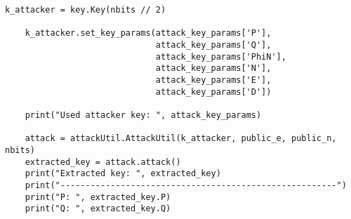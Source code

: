 \begin{lstlisting}[language=PyBrIM]
    k_attacker = key.Key(nbits // 2)

    k_attacker.set_key_params(attack_key_params['P'],
                              attack_key_params['Q'],
                              attack_key_params['PhiN'],
                              attack_key_params['N'],
                              attack_key_params['E'],
                              attack_key_params['D'])

    print("Used attacker key: ", attack_key_params)

    attack = attackUtil.AttackUtil(k_attacker, public_e, public_n, nbits)
    extracted_key = attack.attack()
    print("Extracted key: ", extracted_key)
    print("-------------------------------------------------------")
    print("P: ", extracted_key.P)
    print("Q: ", extracted_key.Q)
\end{lstlisting}
